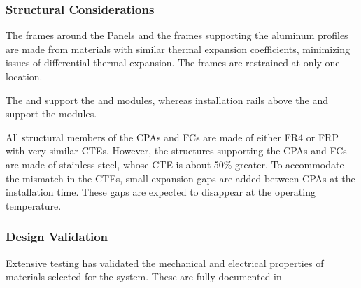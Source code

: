 

\subsubsection{Structural Considerations}

The frames around the  Panels and the frames supporting the  aluminum profiles  
are made from materials with similar thermal expansion coefficients, minimizing issues of differential thermal expansion. The  frames 
are restrained at only one location.  

The  and  support the  and  modules, whereas
installation rails above the  and  support the  modules. 

All structural members of the CPAs and FCs are made of either FR4 or FRP with very similar CTEs. However, the structures supporting the CPAs and FCs are made of stainless steel, whose CTE is about 50\% greater.  To accommodate the mismatch in the CTEs, small expansion gaps are added between CPAs at the installation time.  These gaps are expected to disappear at the operating temperature.
 
\subsubsection{Design Validation}

Extensive testing has %
validated the mechanical and electrical properties of materials selected for the  system.  These are fully documented in~\cite{bib:docdb2338, bib:docdb1504, bib:docdb1601}

